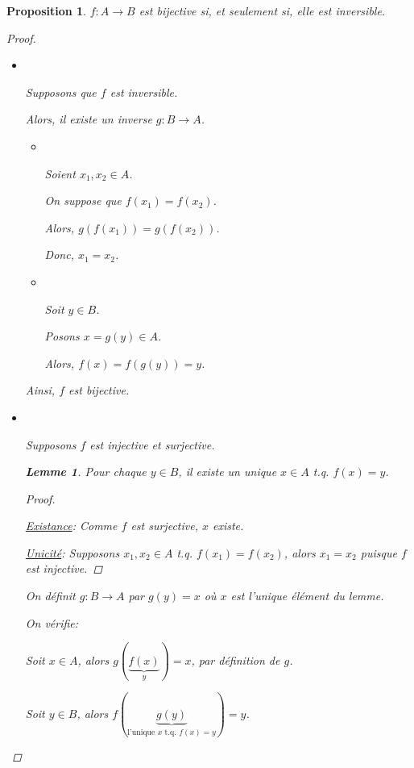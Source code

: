 \documentclass{report}
\newtheorem*{lem}{Lemme}
\newtheorem*{prop}{Proposition}
\theoremstyle{definition}
\theoremstyle{remark}
\begin{document}
	\begin{prop}
		$f:A \to B$ est bijective \emph{si, et seulement si,} elle est inversible.

		\begin{proof}~
			
			\begin{itemize}
				\item[$\Leftarrow$:] ~
				
				Supposons que $f$ est inversible.
				
				Alors, il existe un inverse $g:B \to A$.
				
				\begin{itemize}
					\item[(inj):] ~
					
					Soient $x_1,x_2 \in A$.
					
					On suppose que $f(x_1)=f(x_2)$.
					
					Alors, $g(f(x_1)) = g(f(x_2))$.
					
					Donc, $x_1 = x_2$.
					\item[(surj):] ~
					
					Soit $y \in B$.
					
					Posons $x=g(y) \in A$.
					
					Alors, $f(x)=f(g(y))=y$.
				\end{itemize}
				
				Ainsi, $f$ est bijective.
				\item[$\Rightarrow$:] ~
				
				Supposons $f$ est injective et surjective.
				
				\begin{lem}
					Pour \emph{chaque} $y \in B$, il existe un \emph{unique} $x \in A$ t.q. $f(x)=y$.
					
					\renewcommand{\qedsymbol}{$\blacksquare$}
					\begin{proof}~
						
						\underline{Existance}:
						Comme $f$ est surjective, $x$ existe.
						
						\underline{Unicit\'e}:
						Supposons $x_1,x_2 \in A$ t.q. $f(x_1)=f(x_2)$, alors $x_1=x_2$ puisque $f$ est injective.
					\end{proof}
					\renewcommand{\qedsymbol}{$\square$}
				\end{lem}
				
				On d\'efinit $g:B \to A$ par $g(y)=x$ o\`u $x$ est l'unique \'el\'ement du lemme.
				
				On v\'erifie:
				
				Soit $x \in A$, alors $g(\underbrace{f(x)}_y)=x$, par d\'efinition de $g$.
				
				Soit $y \in B$, alors $f(\underbrace{g(y)}_{\text{l'unique $x$ t.q. $f(x)=y$}})=y$.
			\end{itemize}
		\end{proof}
	\end{prop}
\end{document}
